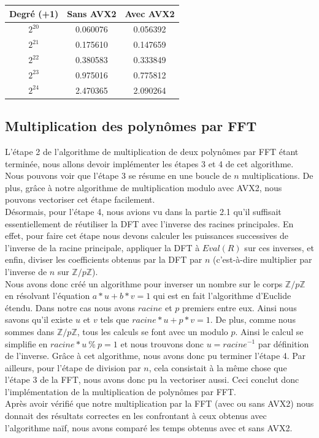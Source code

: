 \documentclass[12pt, a4paper]{article}
\begin{document}
\begin{center}
\begin{tabular}{||c c c||}
\hline
Degré (+1) & Sans AVX2 & Avec AVX2 \\
\hline\hline
$2^{20}$ & 0.060076 & 0.056392 \\
\hline
$2^{21}$ & 0.175610 & 0.147659 \\
\hline
$2^{22}$ & 0.380583 & 0.333849 \\
\hline
$2^{23}$ & 0.975016 & 0.775812 \\
\hline
$2^{24}$ & 2.470365 & 2.090264 \\
\hline
\end{tabular}
\end{center}

\subsection{Multiplication des polynômes par FFT}
L'étape 2 de l'algorithme de multiplication de deux polynômes par FFT étant terminée, nous allons devoir implémenter les étapes 3 et 4 de cet algorithme. \\
Nous pouvons voir que l'étape 3 se résume en une boucle de $n$ multiplications. De plus, grâce à notre algorithme de multiplication modulo avec AVX2, nous pouvons vectoriser cet étape facilement. \\
Désormais, pour l'étape 4, nous avions vu dans la partie 2.1 qu'il suffisait essentiellement de réutiliser la DFT avec l'inverse des racines principales. En effet, pour faire cet étape nous devons calculer les puissances successives de l'inverse de la racine principale, appliquer la DFT à $Eval(R)$ sur ces inverses, et enfin, diviser les coefficients obtenus par la DFT par $n$ (c'est-à-dire multiplier par l'inverse de $n$ sur $\mathbb{Z}/p\mathbb{Z}$). \\
Nous avons donc créé un algorithme pour inverser un nombre sur le corps $\mathbb{Z}/p\mathbb{Z}$ en résolvant l'équation $a*u + b*v=1$ qui est en fait l'algorithme d'Euclide étendu. Dans notre cas nous avons $racine$ et $p$ premiers entre eux. Ainsi nous savons qu'il existe $u$ et $v$ tels que $racine*u + p*v=1$. De plus, comme nous sommes dans $\mathbb{Z}/p\mathbb{Z}$, tous les calculs se font avec un modulo $p$. Ainsi le calcul se simplifie en $racine*u\ \%\ p = 1$ et nous trouvons donc $u = racine^{-1}$ par définition de l'inverse. Grâce à cet algorithme, nous avons donc pu terminer l'étape 4. Par ailleurs, pour l'étape de division par $n$, cela consistait à la même chose que l'étape 3 de la FFT, nous avons donc pu la vectoriser aussi. Ceci conclut donc l'implémentation de la multiplication de polynômes par FFT. \\
Après avoir vérifié que notre multiplication par la FFT (avec ou sans AVX2) nous donnait des résultats correctes en les confrontant à ceux obtenus avec l'algorithme naïf, nous avons comparé les temps obtenus avec et sans AVX2.
\end{document}
